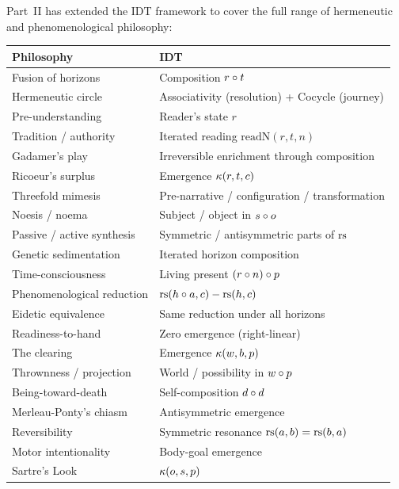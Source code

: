\begin{remark}
Part~II has extended the IDT framework to cover the full range of
hermeneutic and phenomenological philosophy:
\begin{center}
\begin{tabular}{ll}
\textbf{Philosophy} & \textbf{IDT} \\
\hline
Fusion of horizons & Composition $r \circ t$ \\
Hermeneutic circle & Associativity (resolution) + Cocycle (journey) \\
Pre-understanding & Reader's state $r$ \\
Tradition / authority & Iterated reading $\mathrm{readN}(r, t, n)$ \\
Gadamer's play & Irreversible enrichment through composition \\
Ricoeur's surplus & Emergence $\kappa(r, t, c)$ \\
Threefold mimesis & Pre-narrative / configuration / transformation \\
Noesis / noema & Subject / object in $s \circ o$ \\
Passive / active synthesis & Symmetric / antisymmetric parts of $\mathrm{rs}$ \\
Genetic sedimentation & Iterated horizon composition \\
Time-consciousness & Living present $(r \circ n) \circ p$ \\
Phenomenological reduction & $\mathrm{rs}(h \circ a, c) - \mathrm{rs}(h, c)$ \\
Eidetic equivalence & Same reduction under all horizons \\
Readiness-to-hand & Zero emergence (right-linear) \\
The clearing & Emergence $\kappa(w, b, p)$ \\
Thrownness / projection & World / possibility in $w \circ p$ \\
Being-toward-death & Self-composition $d \circ d$ \\
Merleau-Ponty's chiasm & Antisymmetric emergence \\
Reversibility & Symmetric resonance $\mathrm{rs}(a,b) = \mathrm{rs}(b,a)$ \\
Motor intentionality & Body-goal emergence \\
Sartre's Look & $\kappa(o, s, p)$ \\
\end{tabular}
\end{center}
\end{remark}


